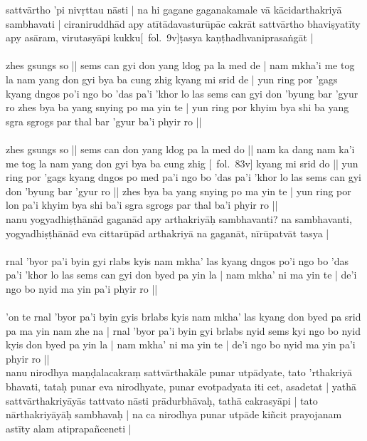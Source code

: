 \documentclass[12pt]{article}
\begin{document}
sattvārtho 'pi nivṛttau nāsti | na hi gagane gaganakamale vā kācidarthakriyā sambhavati | ciraniruddhād apy atītādavasturūpāc cakrāt sattvārtho bhaviṣyatīty apy asāram, virutasyāpi kukku[\MS\ fol.\ 9v]ṭasya kaṇṭhadhvaniprasaṅgāt |\\

\textbf{\TVA}\\
zhes gsungs so || sems can gyi don yang ldog pa la med de | nam mkha'i me tog la nam yang don gyi bya ba cung zhig kyang mi srid de | yun ring por 'gags kyang dngos po'i ngo bo 'das pa'i 'khor lo las sems can gyi don 'byung bar 'gyur ro zhes bya ba yang snying po ma yin te | yun ring por khyim bya shi ba yang sgra sgrogs par thal bar 'gyur ba'i phyir ro || \\

\textbf{\TVB}\\
zhes gsungs so || sems can don yang ldog pa la med do || nam ka dang nam ka'i me tog la nam yang don gyi bya ba cung zhig [\TVB\ fol.\ 83v] kyang mi srid do || yun ring por 'gags kyang dngos po med pa'i ngo bo 'das pa'i 'khor lo las sems can gyi don 'byung bar 'gyur ro || zhes bya ba yang snying po ma yin te | yun ring por lon pa'i khyim bya shi ba'i sgra sgrogs par thal ba'i phyir ro || \\

nanu yogyadhiṣṭhānād gaganād apy arthakriyāḥ sambhavanti? na sambhavanti, yogyadhiṣṭhānād eva cittarūpād arthakriyā na gaganāt, nīrūpatvāt tasya |\\

\textbf{\TVA}\\
rnal 'byor pa'i byin gyi rlabs kyis nam mkha' las kyang dngos po'i ngo bo 'das pa'i 'khor lo las sems can gyi don byed pa yin la | nam mkha' ni ma yin te | de'i ngo bo nyid ma yin pa'i phyir ro || \\

\textbf{\TVB}\\
'on te rnal 'byor pa'i byin gyis brlabs kyis nam mkha' las kyang don byed pa srid pa ma yin nam zhe na | rnal 'byor pa'i byin gyi brlabs nyid sems kyi ngo bo nyid kyis don byed pa yin la | nam mkha' ni ma yin te | de'i ngo bo nyid ma yin pa'i phyir ro || \\

nanu nirodhya maṇḍalacakraṃ sattvārthakāle punar utpādyate, tato 'rthakriyā bhavati, tataḥ punar eva nirodhyate, punar evotpadyata iti cet, asadetat | yathā sattvārthakriyāyās tattvato nāsti prādurbhāvaḥ, tathā cakrasyāpi | tato nārthakriyāyāḥ sambhavaḥ | na ca nirodhya punar utpāde kiñcit prayojanam astīty alam atiprapañceneti |\\
\end{document}
